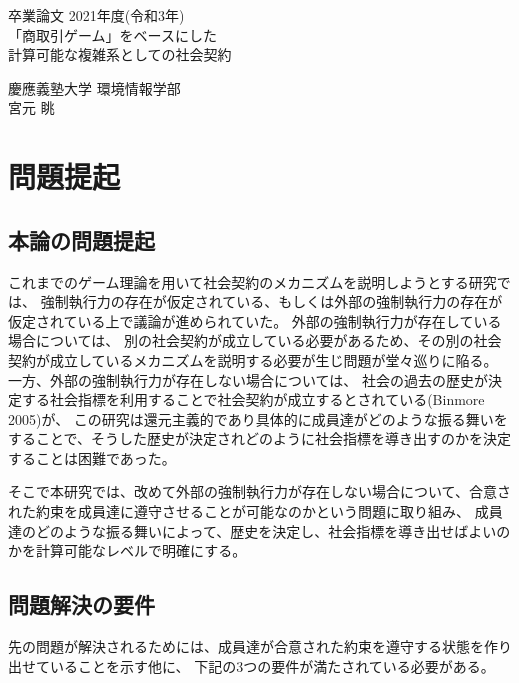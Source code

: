 \documentclass[a4j]{ujreport}
\date{\today}
\def\title{「商取引ゲーム」をベースにした\\計算可能な複雑系としての社会契約}
\def\author{宮元 眺}
\def\dept{慶應義塾大学 環境情報学部}
\begin{document}
\begin{titlepage}
  \begin{center}
    \begin{large}
      卒業論文   2021年度(令和3年)\\
      \vspace{24pt}
      \title
    \end{large}
  \end{center}
  \vspace{40em}
  \begin{flushright}
    \large \dept\\
    \author
  \end{flushright}
\end{titlepage}



\tableofcontents\thispagestyle{plain}



\chapter{問題提起}
\section{本論の問題提起}
これまでのゲーム理論を用いて社会契約のメカニズムを説明しようとする研究では、
強制執行力の存在が仮定されている、もしくは外部の強制執行力の存在が仮定されている上で議論が進められていた。
外部の強制執行力が存在している場合については、
別の社会契約が成立している必要があるため、その別の社会契約が成立しているメカニズムを説明する必要が生じ問題が堂々巡りに陥る。
一方、外部の強制執行力が存在しない場合については、
社会の過去の歴史が決定する社会指標を利用することで社会契約が成立するとされている(Binmore 2005\cite{binmore2005})が、
この研究は還元主義的であり具体的に成員達がどのような振る舞いをすることで、そうした歴史が決定されどのように社会指標を導き出すのかを決定することは困難であった。

そこで本研究では、改めて外部の強制執行力が存在しない場合について、合意された約束を成員達に遵守させることが可能なのかという問題に取り組み、
成員達のどのような振る舞いによって、歴史を決定し、社会指標を導き出せばよいのかを計算可能なレベルで明確にする。


\section{問題解決の要件}
先の問題が解決されるためには、成員達が合意された約束を遵守する状態を作り出せていることを示す他に、
下記の3つの要件が満たされている必要がある。
\end{document}
